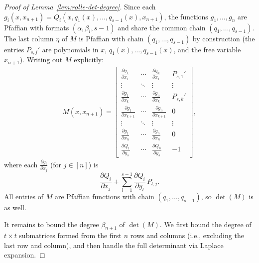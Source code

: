 \begin{proof}[Proof of Lemma~\ref{lem:rolle-det-degree}]
Since each $g_i(x, x_{n+1}) = Q_i(x, q_1(x), \ldots, q_{s-1}(x), x_{n+1})$, the functions $g_1, \ldots, g_n$ are Pfaffian with formats $(\alpha, \beta_i, s-1)$ and share the common chain $(q_1, \ldots, q_{s-1})$. The last column $\eta$ of $M$ is Pfaffian with chain $(q_1,\dots,q_{s-1})$ by construction (the entries $P_{s,j}'$ are polynomials in $x$, $q_1(x),\dots,q_{s-1}(x)$, and the free variable $x_{n+1}$). Writing out $M$ explicitly:
\begin{align*}
  M(x, x_{n+1}) = \begin{bmatrix}
  \frac{\partial g_1}{\partial x_1} & \cdots & \frac{\partial g_n}{\partial x_1} & P_{s,1}' \\[4pt]
  \vdots & \ddots & \vdots & \vdots \\[4pt]
  \frac{\partial g_1}{\partial x_k} & \cdots & \frac{\partial g_n}{\partial x_k} & P_{s,k}' \\[4pt]
  \frac{\partial g_1}{\partial x_{k+1}} & \cdots & \frac{\partial g_n}{\partial x_{k+1}} & 0 \\[4pt]
  \vdots & \ddots & \vdots & \vdots \\[4pt]
  \frac{\partial g_1}{\partial x_n} & \cdots & \frac{\partial g_n}{\partial x_n} & 0 \\[4pt]
  \frac{\partial Q_1}{\partial y_s} & \cdots & \frac{\partial Q_n}{\partial y_s} & -1
  \end{bmatrix},
\end{align*}
where each $\frac{\partial g_i}{\partial x_j}$ (for $j \in [n]$) is
\begin{equation}\label{eq:expansion}
  \frac{\partial Q_i}{\partial x_j} + \sum_{l=1}^{s-1} \frac{\partial Q_i}{\partial y_l}\, P_{l,j}.
\end{equation}
All entries of $M$ are Pfaffian functions with chain $(q_1, \ldots, q_{s-1})$, so $\det(M)$ is as well.

It remains to bound the degree $\beta_{n+1}$ of $\det(M)$. We first bound the degree of $t\times t$ submatrices formed from the first $n$ rows and columns (i.e., excluding the last row and column), and then handle the full determinant via Laplace expansion. 


\end{proof}
